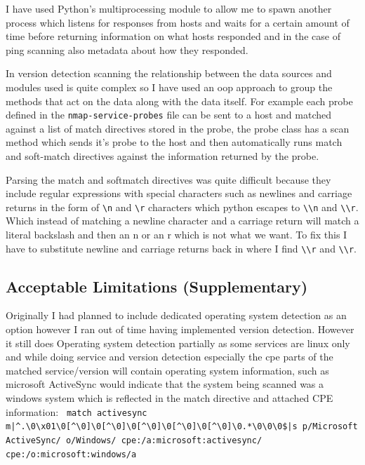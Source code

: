 \documentclass[titlepage]{article}
\let\Oldsubsection\subsection{}
\renewcommand{\subsection}{\FloatBarrier\Oldsubsection}
\begin{document}
I have used Python's multiprocessing module to allow me to spawn another process which listens
for responses from hosts and waits for a certain amount of time before returning information
on what hosts responded and in the case of ping scanning also metadata about how they responded.

In version detection scanning the relationship between the data sources and modules used is quite
complex so I have used an \gls{oop} approach to group the methods
that act on the data along with the data itself. For example each probe defined in the \verb|nmap-service-probes|
file can be sent to a host and matched against a list of match directives stored in the probe,
the probe class has a scan method which sends it's probe to the host and then automatically runs
match and soft-match directives against the information returned by the probe.

Parsing the match and softmatch directives was quite difficult because they include regular
expressions with special characters such as newlines and carriage returns in the form of
\verb|\n| and \verb|\r| characters which python escapes to \verb|\\n|
and \verb|\\r|. Which instead of matching a newline character and a carriage return
will match a literal backslash and then an n or an r which is not what we want. To fix this I have to substitute
newline and carriage returns back in where I find \verb|\\r| and \verb|\\r|.

\subsection{Acceptable Limitations (Supplementary)}

Originally I had planned to include dedicated operating system detection as an option
however I ran out of time having implemented version detection. However it still does
Operating system detection partially as some \glspl{service} are linux only and while doing
\gls{service} and version detection especially the \gls{cpe} parts
of the matched \gls{service}/version will contain operating system information, such as
microsoft ActiveSync would indicate that the system being scanned was a windows system
which is reflected in the match directive and attached CPE information: \texttt{%
match activesync m|{\textasciicircum}.{\textbackslash}0{\textbackslash}x01{\textbackslash}0[{\textasciicircum}{\textbackslash}0]{\textbackslash}0[{\textasciicircum}{\textbackslash}0]{\textbackslash}0[{\textasciicircum}{\textbackslash}0]{\textbackslash}0[{\textasciicircum}{\textbackslash}0]{\textbackslash}0[{\textasciicircum}{\textbackslash}0]{\textbackslash}0.*{\textbackslash}0{\textbackslash}0{\textbackslash}0\$|s p/Microsoft ActiveSync/ o/Windows/ cpe:/a:microsoft:activesync/ cpe:/o:microsoft:windows/a
}
\end{document}
